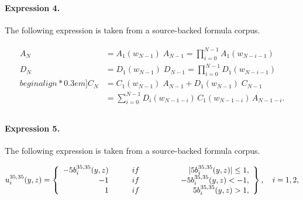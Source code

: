 \documentclass[11pt]{article}
\begin{document}
\paragraph{Expression 4.} The following expression is taken from a source-backed formula corpus.

\begin{align*} \begin{aligned}A_N &= A_1(w_{N-1})\;\! A_{N-1} = \prod_{i=0}^{N-1} A_1(w_{N-i-1}) \\D_N &= D_1(w_{N-1})\;\! D_{N-1} = \prod_{i=0}^{N-1} D_1(w_{N-i-1}) \\begin{align*}0.3em]C_N &= C_1(w_{N-1})\;\! A_{N-1} + D_1(w_{N-1})\;\! C_{N-1} \\&= \sum_{i=0}^{N-1} D_i(w_{N-1-i})\, C_1(w_{N-1-i}) \, A_{N-1-i} . \\\end{aligned} \end{align*}

\paragraph{Expression 5.} The following expression is taken from a source-backed formula corpus.

\begin{align*}u^{35,35}_i(y,z)=\left\{\begin{array}{rrrl}- 5 b_i^{35,35}(y,z) \ & \ \ \ \ \ if& \ \ \ \ \ \ \ \ \ \ \ \ |5 b_i^{35,35}(y,z)|\leq 1, \\-1 \ & \ \ \ \ \ if& \ \ \ \ \ \ \ \ \ \ \ \ \ -5 b_i^{35,35}(y,z) < -1,\\1 \ & \ \ \ \ \ if& \ \ \ \ \ \ \ \ \ \ \ \ \-5 b_i^{35,35}(y,z) > 1,\\\end{array}\right\},\ \ \ i=1,2,\end{align*}
\end{document}
